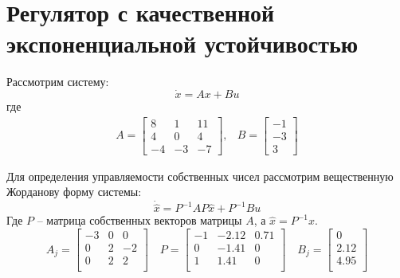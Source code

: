 \section{Регулятор с качественной экспоненциальной устойчивостью}
Рассмотрим систему: 
\begin{equation}
    \dot{x} = Ax + Bu
\end{equation}
где 
\begin{equation}
    \begin{array}{cc}
        A = \begin{bmatrix}
            8 & 1 & 11 \\ 
            4 & 0 & 4 \\
            -4 & -3 & -7
        \end{bmatrix}, &
        B = \begin{bmatrix}
            -1 \\ -3 \\ 3
        \end{bmatrix}
    \end{array}
\end{equation}


Для определения управляемости собственных чисел рассмотрим вещественную Жорданову форму системы: 
\begin{equation}
    \dot{\hat{x}} = P^{-1}AP\hat{x} + P^{-1}Bu
\end{equation}
Где $P$ -- матрица собственных векторов матрицы $A$, а $\hat{x} = P^{-1}x$.
\begin{equation}
    A_j = \begin{bmatrix}
        -3  & 0  & 0 \\ 
        0  & 2  & -2 \\ 
        0  & 2  & 2 \\ 
    \end{bmatrix}\quad
    P = \begin{bmatrix}
        -1  & -2.12  & 0.71 \\ 
        0  & -1.41  & 0 \\ 
        1  & 1.41  & 0 \\ 
    \end{bmatrix}\quad 
    B_j = \begin{bmatrix}
        0 \\ 
        2.12 \\ 
        4.95 \\ 
    \end{bmatrix}
\end{equation}

